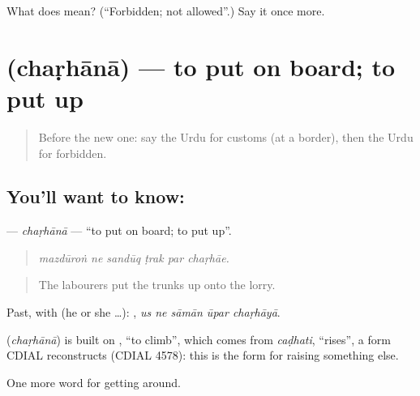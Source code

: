 \begin{tcolorbox}[breakable,colback=teal!4,colframe=teal!35!black,title={Before you move on}]
What does  mean? (\textquotedblleft{}Forbidden; not allowed\textquotedblright{}.) Say it once more.
\end{tcolorbox}
\section[\texorpdfstring{\ur{چڑھانا} (chaṛhānā)}{چڑھانا (chaṛhānā)}]{ (chaṛhānā) — to put on board; to put up}

\label{lesson:UR-C399-charhana}



\begin{quote}
Before the new one: say the Urdu for customs (at a border), then the Urdu for forbidden.
\end{quote}

\subsection*{You'll want to know: }
\textbf{} — \emph{chaṛhānā} — \textquotedblleft{}to put on board; to put up\textquotedblright{}.

\begin{quote}
     
\end{quote}

\begin{quote}
\emph{mazdūroṅ ne sandūq ṭrak par chaṛhāe.}
\end{quote}

\begin{quote}
The labourers put the trunks up onto the lorry.
\end{quote}

Past, with  (he or she …):     , \emph{us ne sāmān ūpar chaṛhāyā}.

\begin{cousinweb}
\textbf{} (\emph{chaṛhānā}) is built on \textbf{}, \textquotedblleft{}to climb\textquotedblright{}, which comes from \emph{caḍhati}, \textquotedblleft{}rises\textquotedblright{}, a form CDIAL reconstructs (CDIAL 4578): this is the form for raising something else.
\end{cousinweb}

\begin{grammarlens}[title={What you've built}]
One more word for getting around.
\end{grammarlens}

